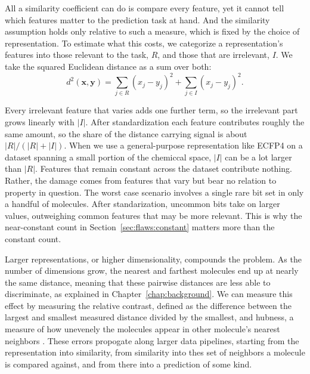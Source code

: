 All a similarity coefficient can do is compare every feature, yet it cannot tell which features matter to the prediction task at hand. And the similarity assumption holds only relative to such a measure, which is fixed by the choice of representation. To estimate what this costs, we categorize a representation's features into those relevant to the task, $R$, and those that are irrelevant, $I$. We take the squared Euclidean distance as a sum over both:
\begin{equation}
d^2(\mathbf{x},\mathbf{y}) = \sum_{j \in R}(x_j-y_j)^2 + \sum_{j \in I}(x_j-y_j)^2 .
\label{eq:distance_split}
\end{equation}

Every irrelevant feature that varies adds one further term, so the irrelevant part grows linearly with $|I|$. After standardization each feature contributes roughly the same amount, so the share of the distance carrying signal is about $|R|/(|R|+|I|)$. When we use a general-purpose representation like ECFP4 on a dataset spanning a small portion of the chemiccal space, $|I|$ can be a lot larger than $|R|$. Features that remain constant across the dataset contribute nothing. Rather, the damage comes from features that vary but bear no relation to property in question. The worst case scenario involves a single rare bit set in only a handful of molecules. After standarization, uncommon bits take on larger values, outweighing common features that may be more relevant. This is why the near-constant count in Section~\ref{sec:flaws:constant} matters more than the constant count.


Larger representations, or higher dimensionality, compounds the problem. As the number of dimensions grow, the nearest and farthest molecules end up at nearly the same distance, meaning that these pairwise distances are less able to discriminate, as explained in Chapter~\ref{chap:background}. We can measure this effect by measuring the relative contrast, defined as the difference between the largest and smallest measured distance divided by the smallest, and hubness, a measure of how unevenely the molecules appear in other molecule's nearest neighbors \citep{Radovanovic2010}. These errors propogate along larger data pipelines, starting from the representation into similarity, from similarity into thes set of neighbors a molecule is compared against, and from there into a prediction of some kind. 




